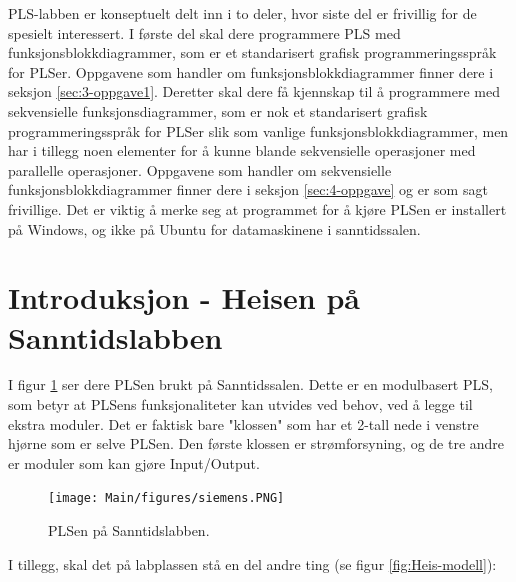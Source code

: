 \begin{alphasection}
PLS-labben er konseptuelt delt inn i to deler, hvor siste del er frivillig for de spesielt interessert. I første del skal dere programmere PLS med funksjonsblokkdiagrammer, som er et standarisert grafisk programmeringsspråk for PLSer. Oppgavene som handler om funksjonsblokkdiagrammer finner dere i seksjon \ref{sec:3-oppgave1}. Deretter skal dere få kjennskap til å programmere med sekvensielle funksjonsdiagrammer, som er nok et standarisert grafisk programmeringsspråk for PLSer slik som vanlige funksjonsblokkdiagrammer, men har i tillegg noen elementer for å kunne blande sekvensielle operasjoner med parallelle operasjoner. Oppgavene som handler om sekvensielle funksjonsblokkdiagrammer finner dere i seksjon \ref{sec:4-oppgave} og er som sagt frivillige. Det er viktig å merke seg at programmet for å kjøre PLSen er installert på Windows, og ikke på Ubuntu for datamaskinene i sanntidssalen.






\section{Introduksjon - Heisen på Sanntidslabben}\label{sec:1-intro}



I figur \ref{fig:siemens-pls} ser dere PLSen brukt på Sanntidssalen. Dette er en modulbasert PLS, som betyr at PLSens funksjonaliteter kan utvides ved behov, ved å legge til ekstra moduler. Det er faktisk bare "klossen" som har et 2-tall nede i venstre hjørne som er selve PLSen. Den første klossen er strømforsyning, og de tre andre er moduler som kan gjøre Input/Output. 

\begin{figure}[ht]
    \centering
    \texttt{[image: Main/figures/siemens.PNG]}
    \caption{PLSen på Sanntidslabben.}
    \label{fig:siemens-pls}
\end{figure}

I tillegg, skal det på labplassen stå en del andre ting (se figur \ref{fig:Heis-modell}):



\end{alphasection}
